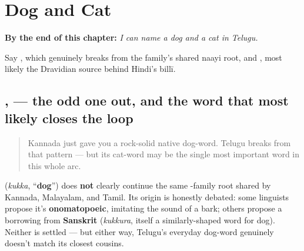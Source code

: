 
\chapter{Dog and Cat}
\label{ch:te-dog-and-cat}

\begin{chapteropening}
\textbf{By the end of this chapter:} \emph{I can name a dog and a cat in Telugu.}

Say , which genuinely breaks from the family's shared naayi root, and , most likely the Dravidian source behind Hindi's billī.
\end{chapteropening}

\section[\texorpdfstring{\te{కుక్క}, \te{పిల్లి} (kukka, pilli)}{కుక్క, పిల్లి (kukka, pilli)}]{,  — the odd one out, and the word that most likely closes the loop}

\label{lesson:TE-C21-kukka-pilli}



\begin{quote}
Kannada just gave you a rock-solid native dog-word. Telugu breaks from that pattern — but its cat-word may be the single most important word in this whole arc.
\end{quote}

\begin{cousinweb}
\textbf{} (\emph{kukka}, \textquotedblleft{}\textbf{dog}\textquotedblright{}) does \textbf{not} clearly continue the same \textbf{}-family root shared by Kannada, Malayalam, and Tamil. Its origin is honestly debated: some linguists propose it's \textbf{onomatopoeic}, imitating the sound of a bark; others propose a borrowing from \textbf{Sanskrit} \textbf{} (\emph{kukkura}, itself a similarly-shaped word for dog). Neither is settled — but either way, Telugu's everyday dog-word genuinely doesn't match its closest cousins.
\end{cousinweb}


